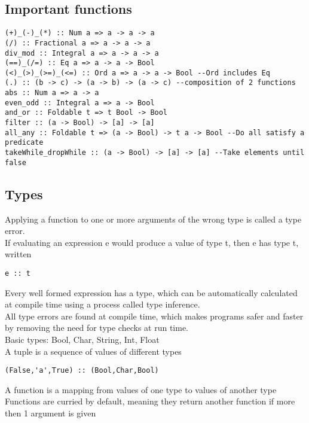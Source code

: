\documentclass[12pt]{article}
\begin{document}
\subsection*{Important functions}
\begin{verbatim}
(+)_(-)_(*) :: Num a => a -> a -> a
(/) :: Fractional a => a -> a -> a
div_mod :: Integral a => a -> a -> a
(==)_(/=) :: Eq a => a -> a -> Bool
(<)_(>)_(>=)_(<=) :: Ord a => a -> a -> Bool --Ord includes Eq
(.) :: (b -> c) -> (a -> b) -> (a -> c) --composition of 2 functions
abs :: Num a => a -> a
even_odd :: Integral a => a -> Bool
and_or :: Foldable t => t Bool -> Bool
filter :: (a -> Bool) -> [a] -> [a]
all_any :: Foldable t => (a -> Bool) -> t a -> Bool --Do all satisfy a predicate
takeWhile_dropWhile :: (a -> Bool) -> [a] -> [a] --Take elements until false
\end{verbatim}

\subsection*{Types}
Applying a function to one or more arguments of the wrong type is called a type error.\\
If evaluating an expression e would produce a value of type t, then e has type t, written
\begin{verbatim}
e :: t
\end{verbatim}
Every well formed expression has a type, which can be automatically calculated at compile time using a process called type inference.\\
All type errors are found at compile time, which makes programs safer and faster by removing the need for type checks at run time.\\
Basic types: Bool, Char, String, Int, Float\\
A tuple is a sequence of values of different types
\begin{verbatim}
(False,'a',True) :: (Bool,Char,Bool)
\end{verbatim}
A function is a mapping from values of one type to values of another type\\
Functions are curried by default, meaning they return another function if more then 1 argument is given\\
\end{document}
